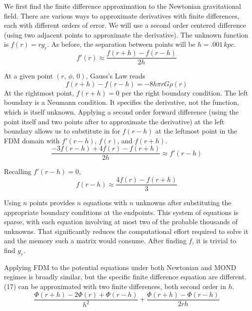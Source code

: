 \documentclass[11pt, twocolumn]{article}
\begin{document}
    We first find the finite difference approximation to the Newtonian gravitational field. There are various ways to approximate derivatives with finite differences, each with different orders of error. We will use a second order centered difference (using two adjacent points to approximate the derivative). The unknown function is $f(r) = rg_r$. As before, the separation between points will be $h = .001 \si{\, kpc}$.
    \begin{equation} f'(r) \approx \frac{f(r + h) - f(r - h)}{2h} \end{equation}

    At a given point $(r, \, \phi, \, 0)$, Gauss's Law reads
    \begin{equation} f(r + h) - f(r - h) = -8h\pi rG\rho (r) \end{equation}
    At the rightmost point, $f(r + h) = 0$ per the right boundary condition. The left boundary is a Neumann condition. It specifies the derivative, not the function, which is itself unknown. Applying a second order forward difference (using the point itself and two points after to approximate the derivative) at the left boundary allows us to substitute in for $f(r - h)$ at the leftmost point in the FDM domain with $f'(r - h)$, $f(r)$, and $f(r + h)$.
    \begin{equation} \frac{-3f(r - h) + 4f(r) - f(r + h)}{2h} \approx f'(r - h) \end{equation}

    Recalling $f'(r - h) = 0$,
    \begin{equation} f(r - h) \approx \frac{4f(r) - f(r + h)}{3} \end{equation}

    Using $n$ points provides $n$ equations with $n$ unknowns after substituting the appropriate boundary conditions at the endpoints. This system of equations is sparse, with each equation involving at most two of the probable thousands of unknowns. That significantly reduces the computational effort required to solve it and the memory such a matrix would consume. After finding $f$, it is trivial to find $g_r$.

    Applying FDM to the potential equations under both Newtonian and MOND regimes is broadly similar, but the specific finite difference equation are different. (17) can be approximated with two finite differences, both second order in $h$.
    \begin{equation} \frac{\Phi (r + h) - 2\Phi (r) + \Phi (r - h)}{h^2} + \frac{\Phi(r + h) - \Phi(r - h)}{2rh} \end{equation}
    
\end{document}
